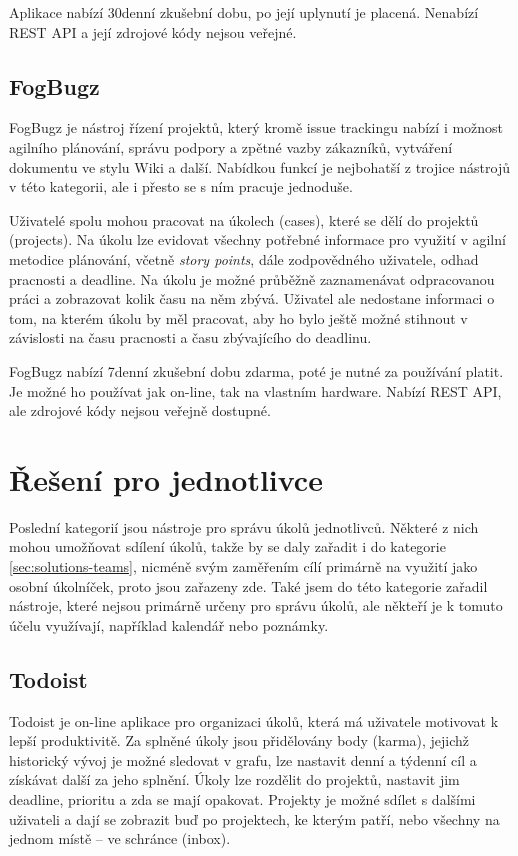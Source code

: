 \documentclass[thesis=B,czech]{FITthesis}[2012/06/26]
\begin{document}
			Aplikace nabízí 30denní zkušební dobu, po její uplynutí je placená. Nenabízí REST API a její zdrojové kódy nejsou veřejné.
			
		\subsection{FogBugz}
			FogBugz \cite{fogbugz} je nástroj řízení projektů, který kromě issue trackingu nabízí i možnost agilního plánování\cite{agile-planning}, správu podpory a zpětné vazby zákazníků, vytváření dokumentu ve stylu Wiki a další. Nabídkou funkcí je nejbohatší z trojice nástrojů v této kategorii, ale i přesto se s ním pracuje jednoduše. 
			
			Uživatelé spolu mohou pracovat na úkolech (cases), které se dělí do projektů (projects). Na úkolu lze evidovat všechny potřebné informace pro využití v agilní metodice plánování, včetně \textit{story points}, dále zodpovědného uživatele, odhad pracnosti a deadline. Na úkolu je možné průběžně zaznamenávat odpracovanou práci a zobrazovat kolik času na něm zbývá. Uživatel ale nedostane informaci o tom, na kterém úkolu by měl pracovat, aby ho bylo ještě možné stihnout v závislosti na času pracnosti a času zbývajícího do deadlinu.
			
			FogBugz nabízí 7denní zkušební dobu zdarma, poté je nutné za používání platit. Je možné ho používat jak on-line, tak na vlastním hardware. Nabízí REST API, ale zdrojové kódy nejsou veřejně dostupné.

	\section{Řešení pro jednotlivce}
		Poslední kategorií jsou nástroje pro správu úkolů jednotlivců. Některé z nich mohou umožňovat sdílení úkolů, takže by se daly zařadit i do kategorie \ref{sec:solutions-teams}, nicméně svým zaměřením cílí primárně na využití jako osobní úkolníček, proto jsou zařazeny zde. Také jsem do této kategorie zařadil nástroje, které nejsou primárně určeny pro správu úkolů, ale někteří je k tomuto účelu využívají, například kalendář nebo poznámky.
		
		\subsection{Todoist}
			Todoist \cite{todoist} je on-line aplikace pro organizaci úkolů, která má uživatele motivovat k lepší produktivitě. Za splněné úkoly jsou přidělovány body (karma), jejichž historický vývoj je možné sledovat v grafu, lze nastavit denní a týdenní cíl a získávat další  za jeho splnění. Úkoly lze rozdělit do projektů, nastavit jim deadline, prioritu a zda se mají opakovat. Projekty je možné sdílet s dalšími uživateli a dají se zobrazit buď po projektech, ke kterým patří, nebo všechny na jednom místě -- ve schránce (inbox). 
			
\end{document}
